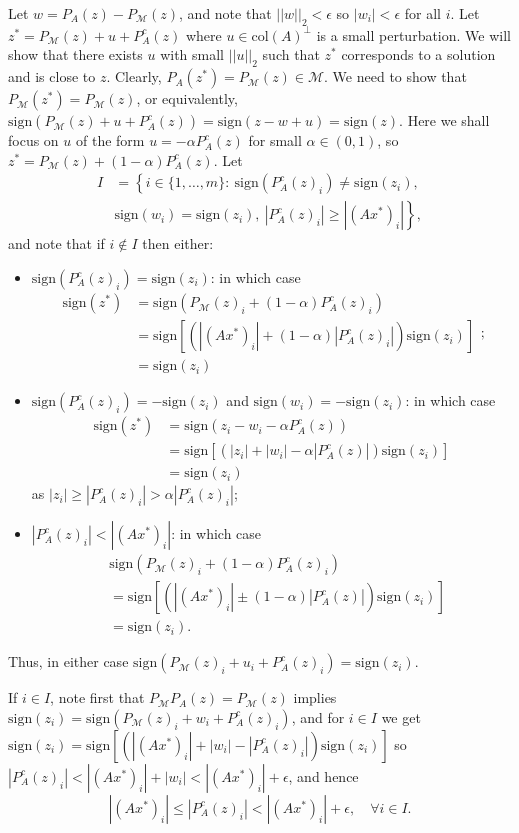 \documentclass[12pt]{article}
\theoremstyle{definition}
\theoremstyle{remark}
\theoremstyle{definition}
\theoremstyle{problem}
\theoremstyle{definition}
\newcommand{\col}{\text{col}}
\newcommand{\sign}{\text{sign}}
\newcommand{\MM}{\mathcal{M}}
\begin{document}
Let $w = P_A(z) - P_{\MM}(z)$, and note that $||w||_2 < \epsilon$ so $|w_i|< \epsilon$ for all $i$. Let $z^* = P_{\MM}(z) + u + P_A^c(z)$ where $u\in\col(A)^{\perp}$ is a small perturbation. We will show that there exists $u$ with small $||u||_2$ such that $z^*$ corresponds to a solution and is close to $z$. Clearly, $P_A(z^*)=P_{\MM}(z)\in\MM$. We need to show that $P_{\MM}(z^*)=P_{\MM}(z)$, or equivalently, $\sign(P_{\MM}(z)+u+P_A^c(z))=\sign(z-w+u)=\sign(z)$. Here we shall focus on $u$ of the form $u=-\alpha P_A^c(z)$ for small $\alpha\in(0,1)$, so $z^* = P_{\MM}(z) + (1-\alpha)P_A^c(z)$. Let
\[\begin{aligned}I &= \left\{i\in\{1,\ldots, m\}:\ \sign(P_A^c(z)_i)\neq \sign(z_i),\right. \\ &\left.  \sign(w_i) = \sign(z_i),\ |P_A^c(z)_i|\geq |(Ax^*)_i|\right\},\end{aligned}\]
and note that if $i\notin I$ then either:
\begin{itemize}
	\item $\sign(P_A^c(z)_i)=\sign(z_i)$: in which case
	\[\begin{aligned} \sign(z^*)&=\sign(P_{\MM}(z)_i+(1-\alpha)P_A^c(z)_i)\\& =\sign\left[(|(Ax^*)_i|+(1-\alpha)|P_A^c(z)_i|)\sign(z_i)\right]\\&=\sign(z_i) \end{aligned};\]
	
	\item $\sign(P_A^c(z)_i)=-\sign(z_i)$ and $\sign(w_i) = -\sign(z_i)$: in which case
	\[ \begin{aligned}
      \sign(z^*)&=\sign(z_i-w_i-\alpha P_A^c(z))\\&=\sign\left[(|z_i|+|w_i|-\alpha|P_A^c(z)|)\sign(z_i)\right]\\&=\sign(z_i)
	\end{aligned}\]
	 as $|z_i|\geq |P_A^c(z)_i| > \alpha|P_A^c(z)_i|$;
	 
	\item $|P_A^c(z)_i|<|(Ax^*)_i|$: in which case
	\[\begin{aligned}
	&\sign(P_{\MM}(z)_i+(1-\alpha)P_A^c(z)_i) \\&= \sign[(|(Ax^*)_i|\pm (1-\alpha)|P_A^c(z)|)\sign(z_i)] \\&= \sign(z_i).
	\end{aligned}\]
\end{itemize}
Thus, in either case $\sign(P_{\MM}(z)_i + u_i + P_A^c(z)_i) = \sign(z_i)$.

If $i\in I$, note first that $P_{\MM}P_A(z) = P_{\MM}(z)$ implies $\sign(z_i) = \sign(P_{\MM}(z)_i+w_i+P_A^c(z)_i)$, and for $i\in I$ we get $\sign(z_i) = \sign\left[(|(Ax^*)_i| + |w_i| - |P_A^c(z)_i|)\sign(z_i)\right]$ so $|P_A^c(z)_i|<|(Ax^*)_i| + |w_i|< |(Ax^*)_i| + \epsilon$, and hence
\[|(Ax^*)_i|\leq |P_A^c(z)_i|<|(Ax^*)_i| + \epsilon,\quad \forall i\in I.\]
\end{document}
